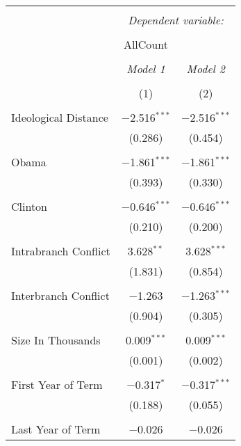 \documentclass{article}
\begin{document}


\begin{table}[!htbp] \centering 
  \caption{} 
  \label{} 
\begin{tabular}{@{\extracolsep{5pt}}lcc} 
\\[-1.8ex]\hline 
\hline \\[-1.8ex] 
 & \multicolumn{2}{c}{\textit{Dependent variable:}} \\ 
\cline{2-3} 
\\[-1.8ex] & AllCount &   \\ 
\\[-1.8ex] & \textit{Model 1} & \textit{Model 2} \\ 
\\[-1.8ex] & (1) & (2)\\ 
\hline \\[-1.8ex] 
 Ideological Distance & $-$2.516$^{***}$ & $-$2.516$^{***}$ \\ 
  & (0.286) & (0.454) \\ 
  & & \\ 
 Obama & $-$1.861$^{***}$ & $-$1.861$^{***}$ \\ 
  & (0.393) & (0.330) \\ 
  & & \\ 
 Clinton & $-$0.646$^{***}$ & $-$0.646$^{***}$ \\ 
  & (0.210) & (0.200) \\ 
  & & \\ 
 Intrabranch Conflict & 3.628$^{**}$ & 3.628$^{***}$ \\ 
  & (1.831) & (0.854) \\ 
  & & \\ 
 Interbranch Conflict & $-$1.263 & $-$1.263$^{***}$ \\ 
  & (0.904) & (0.305) \\ 
  & & \\ 
 Size In Thousands & 0.009$^{***}$ & 0.009$^{***}$ \\ 
  & (0.001) & (0.002) \\ 
  & & \\ 
 First Year of Term & $-$0.317$^{*}$ & $-$0.317$^{***}$ \\ 
  & (0.188) & (0.055) \\ 
  & & \\ 
 Last Year of Term & $-$0.026 & $-$0.026 \\ 

\end{tabular}
\end{table}
\end{document}
